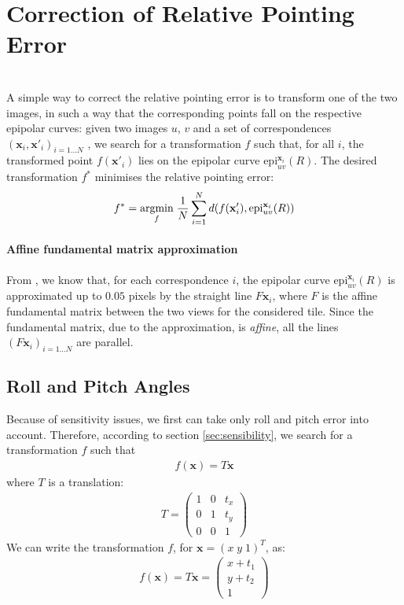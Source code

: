 \documentclass[paper=a4, fontsize=11pt, onecolumn, tikz, dvipsnames, svgnames, x11names]{article}
\begin{document}
\section{Correction of Relative Pointing Error}
\cite{de2014automatic}\\

A simple way to correct the relative pointing error is to transform one of the two images, in such a way that the corresponding points fall on the respective epipolar curves: given two images $u$, $v$ and a set of correspondences $(\textbf{x}_i , \textbf{x}'_i)_{i=1...N}$ , we search for a transformation $f$ such that, for all $i$, the transformed point $f(\textbf{x}'_i)$ lies on the epipolar curve $\text{epi}^{\textbf{x}_i}_{u v}(R)$.
The desired transformation $f^{*}$ minimises the relative pointing error:
\begin{align}
\label{minif}
f^* = \underset{f}{\operatorname{argmin}}\; \dfrac{1}{N} \sum\limits_{i=1}^{N} d(f(\textbf{x}'_i), \text{epi}^{\textbf{x}_i}_{u v}(R))
\end{align}

\paragraph{Affine fundamental matrix approximation\\}
From  \cite{de2014automatic}, we know that, for each correspondence $i$, the epipolar curve $\text{epi}^{\textbf{x}_i}_{u v}(R)$ is approximated up to $0.05$ pixels by the straight line $F\textbf{x}_i$, where $F$ is
the affine fundamental matrix between the two views for the considered tile. Since the fundamental matrix, due to the approximation, is \textit{affine}, all the lines $(F\textbf{x}_i)_{i=1...N}$ are parallel.

\subsection{Roll and Pitch Angles}
Because of sensitivity issues, we first can take only roll and pitch error into account. Therefore, according to section \ref{sec:sensibility}, we search for a transformation $f$ such that
\begin{align*}
f(\textbf{x}) = T\textbf{x}
\end{align*}
where $T$ is a translation:
\begin{align*}
T =
\begin{pmatrix}
1 & 0 & t_x \\
0 & 1 & t_y \\
0 & 0 & 1
\end{pmatrix}
\end{align*}
We can write the transformation $f$, for $ \textbf{x} = (  x \; y \; 1)^T $, as:
\begin{align*}
f(\textbf{x}) = T\textbf{x} =
\begin{pmatrix}
x + t_1 \\
y + t_2 \\
1
\end{pmatrix}
\end{align*}
\end{document}
